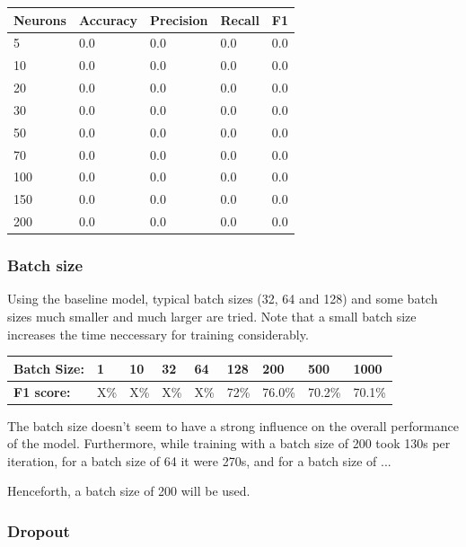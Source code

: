 \documentclass[
	a4paper,
	pagesize,
	pdftex,
	12pt,
	twoside, %
	BCOR=5mm, %
	ngerman,
	fleqn,
	final,
	]{scrartcl}
\begin{document}
\begin{tabular}{ | p{2cm} || p{2cm}|p{2cm}|p{2cm}|p{2cm}|  }
	\hline
	Neurons & Accuracy & Precision & Recall & F1 \\
	\hline
	5 & 0.0 &  0.0 &  0.0 &  0.0 \\
	10 & 0.0 &  0.0 &  0.0 &  0.0 \\
	20 & 0.0 &  0.0 &  0.0 &  0.0 \\
	30 & 0.0 &  0.0 &  0.0 &  0.0 \\
	50 & 0.0 &  0.0 &  0.0 &  0.0 \\
	70 & 0.0 &  0.0 &  0.0 &  0.0 \\
	100 & 0.0 &  0.0 &  0.0 &  0.0 \\
	150 & 0.0 &  0.0 &  0.0 &  0.0 \\
	200 & 0.0 &  0.0 &  0.0 &  0.0 \\
	\hline
	\hline
\end{tabular}



\subsubsection{Batch size}

Using the baseline model, typical batch sizes (32, 64 and 128) and some batch sizes much smaller and much larger are tried. Note that a small batch size increases the time neccessary for training considerably.

\begin{tabular} { | p{3cm} || p{0.8cm} | p{0.8cm} |  p{0.8cm} | p{0.8cm}  | p{0.8cm} | p{0.8cm} | p{0.8cm}| p{0.8cm} |}
	\hline
	\textbf{Batch Size:}  & 1 & 10 & 32 & 64 & 128 & 200 & 500 & 1000\\   
	\hline
	\textbf{F1 score:} & X\% & X\% & X\% & X\% & 72\% & 76.0\% & 70.2\% & 70.1\% \\
	\hline
	\hline
\end{tabular}

The batch size doesn't seem to have a strong influence on the overall performance of the model. Furthermore, while training with a batch size of 200 took 130s per iteration, for a batch size of 64 it were 270s, and for a batch size of ...

Henceforth, a batch size of 200 will be used.

\subsubsection{Dropout}
\end{document}
